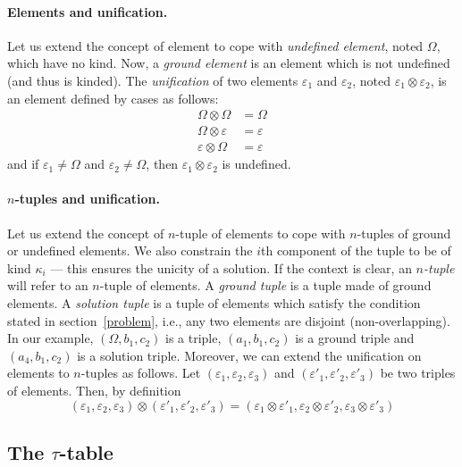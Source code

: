 \paragraph{Elements and unification.}

Let us extend the concept of element to cope with \emph{undefined
  element}, noted \(\Omega\), which have no kind. Now, a \emph{ground
  element} is an element which is not undefined (and thus is
kinded). The \emph{unification} of two elements \(\varepsilon_1\) and
\(\varepsilon_2\), noted \(\varepsilon_1 \otimes \varepsilon_2\), is
an element defined by cases as follows:
\begin{align*}
   \Omega \otimes \Omega &= \Omega\\
   \Omega \otimes \varepsilon &= \varepsilon\\
   \varepsilon \otimes \Omega &= \varepsilon
\end{align*}
\noindent
and if \(\varepsilon_1 \neq \Omega\) and \(\varepsilon_2 \neq
\Omega\), then \(\varepsilon_1 \otimes \varepsilon_2\) is undefined.


\paragraph{\(n\)-tuples and unification.}

Let us extend the concept of \(n\)-tuple of elements to cope with
\(n\)-tuples of ground or undefined elements. We also constrain the
\(i\)th component of the tuple to be of kind \(\kappa_i\) --- this
ensures the unicity of a solution. If the context is clear, an
\emph{\(n\)-tuple} will refer to an \(n\)-tuple of elements. A
\emph{ground tuple} is a tuple made of ground elements. A
\emph{solution tuple} is a tuple of elements which satisfy the
condition stated in section~\ref{problem}, i.e., any two elements are
disjoint (non-overlapping). In our example, \((\Omega, b_1, c_2)\) is
a triple, \((a_1, b_1, c_2)\) is a ground triple and \((a_4, b_1,
c_2)\) is a solution triple. Moreover, we can extend the unification
on elements to \(n\)-tuples as follows. Let \((\varepsilon_1,
\varepsilon_2, \varepsilon_3)\) and \((\varepsilon'_1, \varepsilon'_2,
\varepsilon'_3)\) be two triples of elements. Then, by definition
\[
(\varepsilon_1, \varepsilon_2, \varepsilon_3) \otimes (\varepsilon'_1,
\varepsilon'_2, \varepsilon'_3) = (\varepsilon_1 \otimes
\varepsilon'_1, \varepsilon_2 \otimes \varepsilon'_2, \varepsilon_3
\otimes \varepsilon'_3)
\]


\subsection{The \(\tau\)-table}
\label{tau_table}

